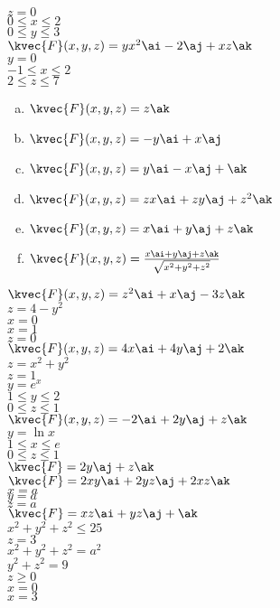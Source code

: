 \(z=0\)   \\
\(0\le x\le2\)  \\
\(0\le y\le 3\)  \\
\(\kvec{F}(x,y,z)=yx^2\ai-2\aj+xz\ak\) \\
\(y=0\) \\
\(-1\le x \le 2\)  \\
\(2\le z\le 7\)    \\
\begin{enumerate}[a.]
\item
 \(\kvec{F}(x,y,z)= z\ak\)

\item 
\(\kvec{F}(x,y,z)=-y\ai+x\aj\)

\item 
\(\kvec{F}(x,y,z)=y\ai-x\aj+\ak\)

\item 
\(\kvec{F}(x,y,z)= zx\ai+zy\aj+z^2\ak\)

\item 
\(\kvec{F}(x,y,z)=x\ai+y\aj+z\ak\)

\item
\(\kvec{F}(x,y,z)=\frac{x\ai+y\aj+z\ak}{\sqrt{x^2+y^2+z^2}}\)
\end{enumerate}


\(\kvec{F}(x,y,z)=z^2\ai+x\aj-3z\ak\)  \\
\(z=4-y^2\)  \\
\(x=0\)    \\
\(x=1\)     \\
\(z=0\)     \\
\(\kvec{F}(x,y,z)=4x\ai+4y\aj+2\ak\) \\
\(z=x^2+y^2\)  \\
\(z=1\)  \\
\(y=e^x\)  \\
\(1\le y \le2\)  \\
\(0\le z\le 1\) \\
\(\kvec{F}(x,y,z)= -2\ai+2y\aj+z\ak\)  \\
\(y=\ln x\)  \\
\(1\le x\le e\)  \\
\(0\le z\le 1\)   \\
\(\kvec{F}=2y\aj+z\ak\)  \\
\(\kvec{F}= 2xy\ai+2yz\aj+2xz\ak\)  \\
\(x=a\) \\
\(y=a\)  \\
\(z=a\)  \\
\(\kvec{F}=xz\ai+yz\aj+\ak\)   \\
\(x^2+y^2+z^2\le 25\)   \\
\(z=3\)  \\
\(x^2+y^2+z^2=a^2\)  \\
\(y^2+z^2=9\)  \\
\(z\ge 0\)  \\
\(x=0\)  \\
\(x=3\)   \\

